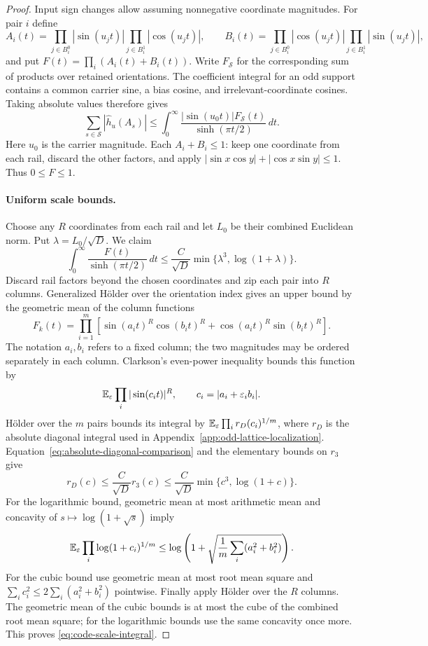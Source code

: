 \begin{proof}
Input sign changes allow assuming nonnegative coordinate magnitudes.
For pair $i$ define
\[
 A_i(t)=\prod_{j\in B_i^0}|\sin(u_jt)|
        \prod_{j\in B_i^1}|\cos(u_jt)|,\qquad
 B_i(t)=\prod_{j\in B_i^0}|\cos(u_jt)|
        \prod_{j\in B_i^1}|\sin(u_jt)|,
\]
and put $F(t)=\prod_i(A_i(t)+B_i(t))$.
Write $F_{\mathcal S}$ for the corresponding sum of products over
retained orientations. The coefficient integral for an odd support
contains a common carrier sine, a bias cosine, and irrelevant-coordinate
cosines. Taking absolute values therefore gives
\begin{equation}\label{eq:code-positive-integral}
 \sum_{s\in\mathcal S}|\widehat h_u(A_s)|
 \le\int_0^\infty
       \frac{|\sin(u_0t)|F_{\mathcal S}(t)}{\sinh(\pi t/2)}\,dt.
\end{equation}
Here $u_0$ is the carrier magnitude. Each $A_i+B_i\le1$: keep one
coordinate from each rail, discard the other factors, and apply
$|\sin x\cos y|+|\cos x\sin y|\le1$. Thus $0\le F\le1$.

\paragraph{Uniform scale bounds.}
Choose any $R$ coordinates from each rail and let $L_0$ be their combined
Euclidean norm. Put $\lambda=L_0/\sqrt D$. We claim
\begin{equation}\label{eq:code-scale-integral}
 \int_0^\infty\frac{F(t)}{\sinh(\pi t/2)}\,dt
 \le\frac C{\sqrt D}
       \min\{\lambda^3,\log(1+\lambda)\}.
\end{equation}
Discard rail factors beyond the chosen coordinates and zip each pair
into $R$ columns. Generalized H\"older over the orientation index gives
an upper bound by the geometric mean of the column functions
\[
 F_k(t)=\prod_{i=1}^m\left[
 \sin(a_it)^R\cos(b_it)^R+\cos(a_it)^R\sin(b_it)^R\right].
\]
The notation $a_i,b_i$ refers to a fixed column; the two magnitudes may
be ordered separately in each column. Clarkson's even-power inequality
bounds this function by
\[
 \mathbb E_{\varepsilon}\prod_i|\sin(c_it)|^R,
 \qquad c_i=|a_i+\varepsilon_i b_i|.
\]
H\"older over the $m$ pairs bounds its integral by
$\mathbb E_\varepsilon\prod_i r_D(c_i)^{1/m}$, where $r_D$ is the absolute
diagonal integral used in Appendix~\ref{app:odd-lattice-localization}.
Equation~\eqref{eq:absolute-diagonal-comparison} and the elementary
bounds on $r_3$ give
\[
 r_D(c)\le\frac C{\sqrt D}r_3(c)
 \le\frac C{\sqrt D}\min\{c^3,\log(1+c)\}.
\]
For the logarithmic bound, geometric mean at most arithmetic mean and
concavity of $s\mapsto\log(1+\sqrt s)$ imply
\[
 \mathbb E_\varepsilon\prod_i\log(1+c_i)^{1/m}
 \le\log\left(1+\sqrt{\frac1m\sum_i(a_i^2+b_i^2)}\right).
\]
For the cubic bound use geometric mean at most root mean square and
$\sum_i c_i^2\le2\sum_i(a_i^2+b_i^2)$ pointwise. Finally apply
H\"older over the $R$ columns. The geometric mean of the cubic bounds
is at most the cube of the combined root mean square; for the logarithmic
bounds use the same concavity once more. This proves
\eqref{eq:code-scale-integral}.


\end{proof}
